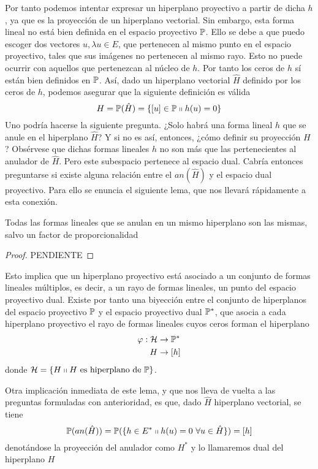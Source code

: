Por tanto podemos intentar expresar un hiperplano proyectivo a partir de dicha $h$, ya que es la proyección de un hiperplano vectorial. Sin embargo, esta forma lineal no está bien definida en el espacio proyectivo $\mathbb{P}$. Ello se debe a que puedo escoger dos vectores  $u, \lambda u\in E$, que pertenecen al mismo punto en el espacio proyectivo, tales que sus imágenes no pertenecen al mismo rayo. Esto no puede ocurrir con aquellos que pertenezcan al núcleo de $h$. Por tanto los ceros de $h$ sí están bien definidos en $\mathbb{P}$. Así, dado un hiperplano vectorial $\hat{H}$ definido por los ceros de $h$, podemos asegurar que la siguiente definición es válida
\begin{equation}
	H=\mathbb{P}(\hat{H})=\{[u]\in\mathbb{P}\shortparallel h(u)=0\}
\end{equation}
Uno podría hacerse la siguiente pregunta. ¿Solo habrá una forma lineal $h$ que se anule en el hiperplano $\hat{H}$? Y si no es así, entonces, ¿cómo definir su proyección $H$? Obsérvese que dichas formas lineales $h$ no son más que las pertenecientes al anulador de $\hat{H}$. Pero este subespacio pertenece al espacio dual. Cabría entonces preguntarse si existe alguna relación entre el $an(\hat{H})$ y el espacio dual proyectivo. Para ello se enuncia el siguiente lema, que nos llevará rápidamente a esta conexión.
\begin{lem}
	\label{C1_lem_multiplosformaslienales}
	Todas las formas lineales que se anulan en un mismo hiperplano son las mismas, salvo un factor de proporcionalidad
\end{lem}
\begin{proof}
	PENDIENTE
\end{proof}
Esto implica que un hiperplano proyectivo está asociado a un conjunto de formas lineales múltiplos, es decir, a un rayo de formas lineales, un punto del espacio proyectivo dual. Existe por tanto una biyección entre el conjunto de hiperplanos del espacio proyectivo $\mathbb{P}$ y el espacio proyectivo dual $\mathbb{P}^*$, que asocia a cada hiperplano proyectivo el rayo de formas lineales cuyos ceros forman el hiperplano
\begin{equation}
	\begin{split}
		\varphi:\mathcal{H}& \rightarrow \mathbb{P}^*\\
		H &\rightarrow [h]
	\end{split}
\end{equation}
donde $\mathcal{H}=\{H\shortparallel H \text{ es hiperplano de } \mathbb{P}\}$.

Otra implicación inmediata de este lema, y que nos lleva de vuelta a las preguntas formuladas con anterioridad, es que, dado $\hat{H}$ hiperplano vectorial, se tiene
\begin{equation}
	\mb{P}(an(\hat{H}))=\mb{P}(\{h\in E^*\tq h(u)=0\ \forall u\in \hat{H}\})=[h]
\end{equation}
denotándose la proyección del anulador como $H^*$ y lo llamaremos dual del hiperplano $H$

